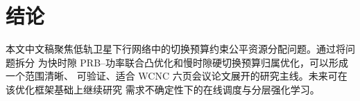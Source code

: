 
\section{结论}

本文中文稿聚焦低轨卫星下行网络中的切换预算约束公平资源分配问题。通过将问题拆分
为快时隙 PRB--功率联合凸优化和慢时隙硬切换预算归属优化，可以形成一个范围清晰、
可验证、适合 WCNC 六页会议论文展开的研究主线。未来可在该优化框架基础上继续研究
需求不确定性下的在线调度与分层强化学习。
